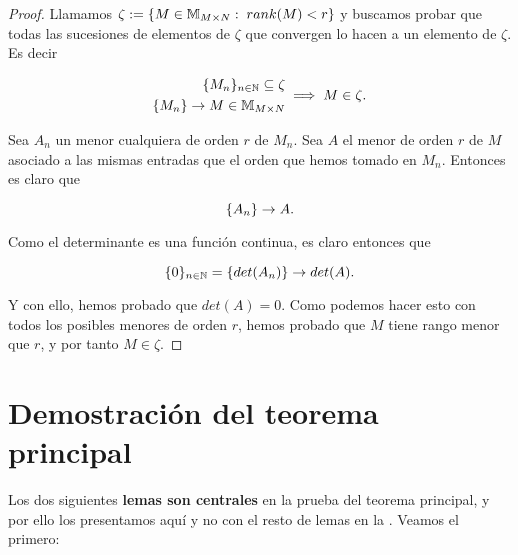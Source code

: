 \begin{proof}
    Llamamos $\zeta := \{ M \in \mathbb{M}_{M \times N}: \; rank(M) < r \}$ y buscamos probar que todas las sucesiones de elementos de $\zeta$ que convergen lo hacen a un elemento de $\zeta$. Es decir

    \begin{equation}
        \begin{split}
            \{ M_n \}_{n \in \mathbb{N}} \subseteq \zeta \\
            \{ M_n \} \to M \in \mathbb{M}_{M \times N} \\
        \end{split}
        \implies M \in \zeta.
    \end{equation}

    Sea $A_n$ un menor cualquiera de orden $r$ de $M_n$. Sea $A$ el menor de orden $r$ de $M$ asociado a las mismas entradas que el orden que hemos tomado en $M_n$. Entonces es claro que

    \begin{equation}
        \{ A_n \} \to A.
    \end{equation}

    Como el determinante es una función continua, es claro entonces que

    \begin{equation}
        \{ 0 \}_{n \in \mathbb{N}} = \{ det(A_n) \} \to det(A).
    \end{equation}

    Y con ello, hemos probado que $det(A) = 0$. Como podemos hacer esto con todos los posibles menores de orden $r$, hemos probado que $M$ tiene rango menor que $r$, y por tanto $M \in \zeta$.
\end{proof}

\section{Demostración del teorema principal}

Los dos siguientes \textbf{lemas son centrales} en la prueba del teorema principal, y por ello los presentamos aquí y no con el resto de lemas en la  . Veamos el primero:


